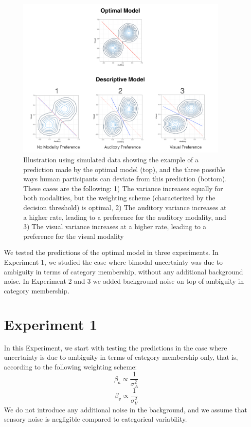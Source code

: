 \documentclass[english,man]{apa6}
\theoremstyle{definition}
\theoremstyle{definition}
\theoremstyle{definition}
\theoremstyle{remark}
\begin{document}
\begin{figure}

{\centering \includegraphics[width=400px]{pictures/sub-optimal} 

}

\caption{Illustration using simulated data showing the example of a prediction made by the optimal model (top), and the three possible ways human participants can deviate from this prediction (bottom). These cases are the following: 1) The variance increases equally for both modalities, but the weighting scheme (characterized by the decision threshold) is optimal, 2) The auditory variance increases at a higher rate, leading to a preference for the auditory modality, and 3) The visual variance increases at a higher rate, leading to a preference for the visual modality}\label{fig:subOptim}
\end{figure}

We tested the predictions of the optimal model in three experiments. In
Experiment 1, we studied the case where bimodal uncertainty was due to
ambiguity in terms of category membership, without any additional
background noise. In Experiment 2 and 3 we added background noise on top
of ambiguity in category membership.

\section{Experiment 1}\label{experiment-1}

In this Experiment, we start with testing the predictions in the case
where uncertainty is due to ambiguity in terms of category membership
only, that is, according to the following weighting scheme:
\[\beta_a \propto \frac{1}{\sigma^2_{A}}\]
\[\beta_v \propto \frac{1}{\sigma^2_{V}}\] We do not introduce any
additional noise in the background, and we assume that sensory noise is
negligible compared to categorical variability.
\end{document}
